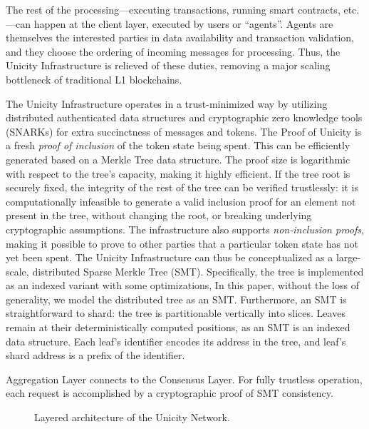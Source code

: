 \documentclass[twocolumn]{article}
\begin{document}
The rest of the processing---executing transactions, running smart contracts, etc.---can happen at the client layer, executed by users or ``agents''. Agents are themselves the interested parties in data availability and transaction validation, and they choose the ordering of incoming messages for processing. Thus, the Unicity Infrastructure is relieved of these duties, removing a major scaling bottleneck of traditional L1 blockchains.

The Unicity Infrastructure operates in a trust-minimized way by utilizing distributed authenticated data structures and cryptographic zero knowledge tools (SNARKs) for extra succinctness of messages and tokens. The Proof of Unicity is a fresh \emph{proof of inclusion} of the token state being spent. This can be efficiently generated based on a Merkle Tree data structure. The proof size is logarithmic with respect to the tree's capacity, making it highly efficient. If the tree root is securely fixed, the integrity of the rest of the tree can be verified trustlessly: it is computationally infeasible to generate a valid inclusion proof for an element not present in the tree, without changing the root, or breaking underlying cryptographic assumptions. The infrastructure also supports \textit{non-inclusion proofs}, making it possible to prove to other parties that a particular token state has not yet been spent. The Unicity Infrastructure can thus be conceptualized as a large-scale, distributed Sparse Merkle Tree (SMT). Specifically, the tree is implemented as an indexed variant with some optimizations, In this paper, without the loss of generality, we model the distributed tree as an SMT. Furthermore, an SMT is straightforward to shard: the tree is partitionable vertically into slices. Leaves remain at their deterministically computed positions, as an SMT is an indexed data structure. Each leaf's identifier encodes its address in the tree, and leaf's shard address is a prefix of the identifier.

Aggregation Layer connects to the Consensus Layer. For fully trustless operation, each request is accomplished by a cryptographic proof of SMT consistency.

\begin{figure}[!htbp]
    \centering
    \caption{Layered architecture of the Unicity Network.}\label{fig:layers}
\end{figure}
\end{document}
